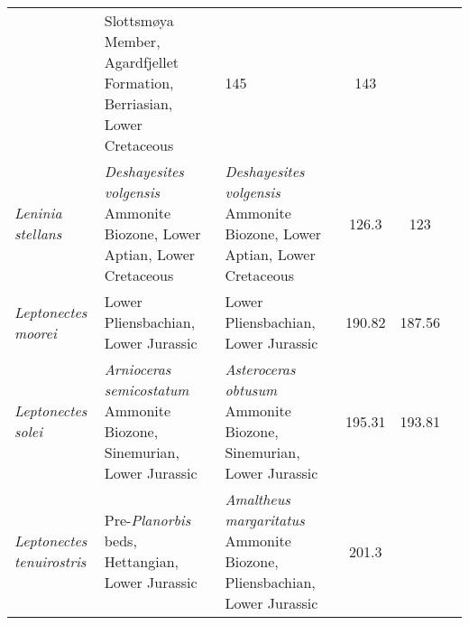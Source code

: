 \begin{longtabu}{>{\itshape}lXXSSl}
                                                             & Slottsmøya
        Member, Agardfjellet Formation, Berriasian, Lower Cretaceous
                                                             & 145
                                                             & 143
                                                             &
                                                             \cite{Delsett2017PO} \\                    
	Leninia stellans                                     &
        \emph{Deshayesites volgensis} Ammonite Biozone, Lower Aptian, Lower
        Cretaceous                                                     &
        \emph{Deshayesites volgensis} Ammonite Biozone, Lower Aptian, Lower
        Cretaceous                                                     & 126.3
                                                                       & 123
                                                                       &
                                                                       \cite{Fischer2014GM} \\                    
	Leptonectes moorei                                   & Lower
        Pliensbachian, Lower Jurassic
                                                             & Lower
        Pliensbachian, Lower Jurassic
                                                             & 190.82
                                                             & 187.56
                                                             &
                                                             \cite{McGowan1999P} \\                   
	Leptonectes solei                                    & \emph{Arnioceras
        semicostatum} Ammonite Biozone, Sinemurian, Lower Jurassic
                                                             & \emph{Asteroceras
        obtusum} Ammonite Biozone, Sinemurian, Lower Jurassic
                                                             & 195.31
                                                             & 193.81
                                                             &
                                                             \cite{McGowan1993CJES} \\                    
	Leptonectes tenuirostris                             &
        Pre-\emph{Planorbis} beds, Hettangian, Lower Jurassic
                                                             & \emph{Amaltheus
    margaritatus} Ammonite Biozone, Pliensbachian, Lower Jurassic
                                                             & 201.3

\end{longtabu}
